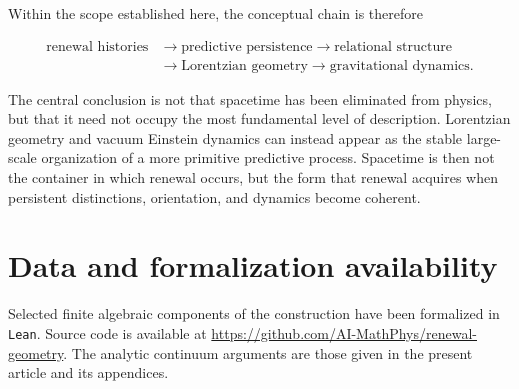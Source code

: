 \documentclass[11pt]{article}
\theoremstyle{definition}
\theoremstyle{remark}
\begin{document}
Within the scope established here, the conceptual chain is therefore


\[
\boxed{
\begin{aligned}
\text{renewal histories}
&\longrightarrow
\text{predictive persistence}
\longrightarrow
\text{relational structure}\\
&\longrightarrow
\text{Lorentzian geometry}
\longrightarrow
\text{gravitational dynamics}.
\end{aligned}
}
\]



The central conclusion is not that spacetime has been eliminated from physics,
but that it need not occupy the most fundamental level of description.
Lorentzian geometry and vacuum Einstein dynamics can instead appear as the
stable large-scale organization of a more primitive predictive process.
Spacetime is then not the container in which renewal occurs, but the form that
renewal acquires when persistent distinctions, orientation, and dynamics become
coherent.


\section*{Data and formalization availability}
Selected finite algebraic components of the construction have been formalized in
\texttt{Lean}.  Source code is available at
\url{https://github.com/AI-MathPhys/renewal-geometry}.  The analytic continuum
arguments are those given in the present article and its appendices.
\end{document}
